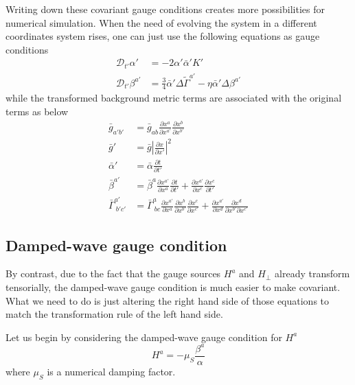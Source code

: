 \documentclass[letterpaper,nofootinbib,prd,amsmath,onecolumn]{revtex4-1}
\begin{document}
Writing down these covariant gauge conditions creates more possibilities for numerical simulation. When the need of evolving the system in a different coordinates system rises, one can just use the following equations as gauge conditions
\begin{align*}
\mathscr{D}_{t'}\alpha' & = -2\alpha'{\bar \alpha}'K'\\
\mathscr{D}_{t'}\beta^{a'} & = \frac{3}{4}{\bar \alpha}'\Delta {\tilde \Gamma}^{a'} - \eta {\bar \alpha}'\Delta\beta^{a'}
\end{align*}
while the transformed background metric terms are associated with the original terms as below
\begin{align}
{\bar g}_{a'b'} & = {\bar g}_{ab}\frac{\partial x^{a}}{\partial x^{a'}}\frac{\partial x^{b}}{\partial x^{b'}}\\
{\bar g'} & = {\bar g}\left|\frac{\partial x}{\partial x'}\right|^{2}\\
{\bar \alpha}' & = {\bar \alpha}\frac{\partial t}{\partial t'}\\
{\bar \beta}^{a'} & = {\bar \beta}^{a}\frac{\partial x^{a'}}{\partial x^{a}}\frac{\partial t}{\partial t'} + \frac{\partial x^{a'}}{\partial x^{c}}\frac{\partial x^{c}}{\partial t'}\label{background shift}\\
{\bar \Gamma}^{a'}_{~b'c'} & = {\bar \Gamma}^{a}_{~bc}\frac{\partial x^{a'}}{\partial x^{a}}\frac{\partial x^{b}}{\partial x^{b'}}\frac{\partial x^{c}}{\partial x^{c'}} + \frac{\partial x^{a'}}{\partial x^{d}}\frac{\partial x^{d}}{\partial x^{b'}\partial x^{c'}}
\end{align}

\subsection{Damped-wave gauge condition}
By contrast, due to the fact that the gauge sources $H^{a}$ and $H_{\perp}$ already transform tensorially, the damped-wave gauge condition is much easier to make covariant. What we need to do is just altering the right hand side of those equations to match the transformation rule of the left hand side. 

Let us begin by considering the damped-wave gauge condition for $H^{a}$
\begin{equation}\label{damped gauge vector}
H^{a} = -\mu_{S}\frac{\beta^{a}}{\alpha}
\end{equation}
where $\mu_{S}$ is a numerical damping factor. 
\end{document}
